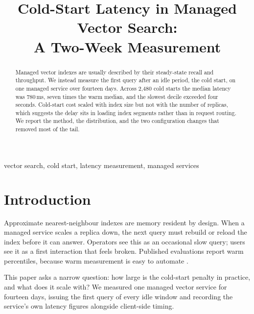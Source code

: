 \documentclass[conference]{IEEEtran}
\begin{document}
\title{Cold-Start Latency in Managed Vector Search:\\A Two-Week Measurement}

\author{
}

\maketitle

\begin{abstract}
Managed vector indexes are usually described by their steady-state recall and throughput.
We instead measure the first query after an idle period, the cold start, on one managed
service over fourteen days. Across 2{,}480 cold starts the median latency was 780\,ms,
seven times the warm median, and the slowest decile exceeded four seconds. Cold-start cost
scaled with index size but not with the number of replicas, which suggests the delay sits
in loading index segments rather than in request routing. We report the method, the
distribution, and the two configuration changes that removed most of the tail.
\end{abstract}

\begin{IEEEkeywords}
vector search, cold start, latency measurement, managed services
\end{IEEEkeywords}

\section{Introduction}
Approximate nearest-neighbour indexes are memory resident by design. When a managed
service scales a replica down, the next query must rebuild or reload the index before it
can answer. Operators see this as an occasional slow query; users see it as a first
interaction that feels broken. Published evaluations report warm percentiles, because
warm measurement is easy to automate \cite{example-survey}.

This paper asks a narrow question: how large is the cold-start penalty in practice, and
what does it scale with? We measured one managed vector service for fourteen days,
issuing the first query of every idle window and recording the service's own latency
figures alongside client-side timing.
\end{document}
